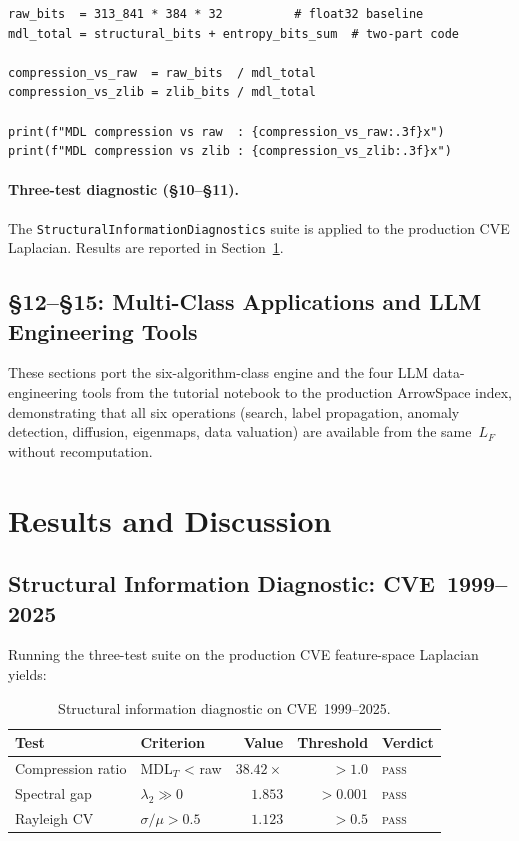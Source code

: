 \documentclass[12pt,a4paper]{article}
\theoremstyle{plain}
\theoremstyle{definition}
\theoremstyle{remark}
\newcommand{\1}{\mathbf{1}}
\begin{document}
	\begin{lstlisting}[caption={Two-part MDL and baselines for CVE},
		label={lst:mdlcve}]
raw_bits  = 313_841 * 384 * 32          # float32 baseline
mdl_total = structural_bits + entropy_bits_sum  # two-part code

compression_vs_raw  = raw_bits  / mdl_total
compression_vs_zlib = zlib_bits / mdl_total

print(f"MDL compression vs raw  : {compression_vs_raw:.3f}x")
print(f"MDL compression vs zlib : {compression_vs_zlib:.3f}x")
	\end{lstlisting}
	
	\paragraph{Three-test diagnostic (§10--§11).}
	The \texttt{StructuralInformationDiagnostics} suite is applied to the
	production CVE Laplacian.
	Results are reported in Section~\ref{sec:results}.
	
	\subsection{§12--§15: Multi-Class Applications and LLM Engineering Tools}
	
	These sections port the six-algorithm-class engine and the four LLM
	data-engineering tools from the tutorial notebook to the production
	ArrowSpace index, demonstrating that all six operations
	(search, label propagation, anomaly detection, diffusion, eigenmaps,
	data valuation) are available from the same~$L_F$ without recomputation.
	
	\section{Results and Discussion}
	\label{sec:results}
	
	\subsection{Structural Information Diagnostic: CVE~1999--2025}
	
	Running the three-test suite on the production CVE feature-space
	Laplacian yields:
	
	\begin{table}[H]
		\centering
		\caption{Structural information diagnostic on CVE~1999--2025.}
		\label{tab:cve-diag}
		\begin{tabular}{llrrl}
			\toprule
			Test & Criterion & Value & Threshold & Verdict \\
			\midrule
			Compression ratio  & MDL$_T$ < raw       & $38.42\times$ & $> 1.0$  & \textsc{pass} \\
			Spectral gap       & $\lambda_2 \gg 0$   & $1.853$        & $> 0.001$& \textsc{pass} \\
			Rayleigh CV        & $\sigma/\mu > 0.5$  & $1.123$        & $> 0.5$  & \textsc{pass} \\
			\bottomrule
		\end{tabular}
	\end{table}
	
\end{document}
